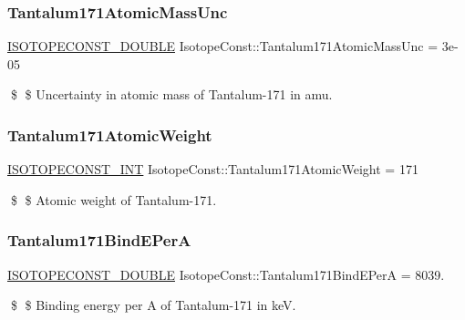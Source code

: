 \subsubsection{\texorpdfstring{Tantalum171\+Atomic\+Mass\+Unc}{Tantalum171AtomicMassUnc}}
{\footnotesize\ttfamily \mbox{\hyperlink{group___isotope_const-_macros_ga8f45a7272ce02c0b4c65c44636ed719a}{I\+S\+O\+T\+O\+P\+E\+C\+O\+N\+S\+T\+\_\+\+D\+O\+U\+B\+LE}} Isotope\+Const\+::\+Tantalum171\+Atomic\+Mass\+Unc = 3e-\/05}

\$ \$ Uncertainty in atomic mass of Tantalum-\/171 in amu. \mbox{\label{group___isotope_const-_tantalum-_ta171_gab045ec9c9c0d429734f022dde3b4911c}} 
\subsubsection{\texorpdfstring{Tantalum171\+Atomic\+Weight}{Tantalum171AtomicWeight}}
{\footnotesize\ttfamily \mbox{\hyperlink{group___isotope_const-_macros_ga5f18360b3e99483a35c32d789e62621c}{I\+S\+O\+T\+O\+P\+E\+C\+O\+N\+S\+T\+\_\+\+I\+NT}} Isotope\+Const\+::\+Tantalum171\+Atomic\+Weight = 171}

\$ \$ Atomic weight of Tantalum-\/171. \mbox{\label{group___isotope_const-_tantalum-_ta171_ga4aa52044f7d45c9c72d4e9f93e15c77e}} 
\subsubsection{\texorpdfstring{Tantalum171\+Bind\+E\+PerA}{Tantalum171BindEPerA}}
{\footnotesize\ttfamily \mbox{\hyperlink{group___isotope_const-_macros_ga8f45a7272ce02c0b4c65c44636ed719a}{I\+S\+O\+T\+O\+P\+E\+C\+O\+N\+S\+T\+\_\+\+D\+O\+U\+B\+LE}} Isotope\+Const\+::\+Tantalum171\+Bind\+E\+PerA = 8039.}

\$ \$ Binding energy per A of Tantalum-\/171 in keV. \mbox{\label{group___isotope_const-_tantalum-_ta171_ga4e0e913b1476156e6235166861ada587}} 

